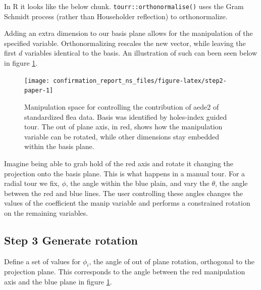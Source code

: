 \documentclass{monashthesis}
\begin{document}
In R it looks like the below chunk. \texttt{tourr::orthonormalise()}
uses the Gram Schmidt process (rather than Householder reflection) to
orthonormalize.

\begin{Shaded}
\begin{Highlighting}[]
\StringTok{ }\NormalTok{(}\NormalTok{, } 
\StringTok{ }
\StringTok{ }\OperatorTok{::}\NormalTok{(}
\end{Highlighting}
\end{Shaded}

Adding an extra dimension to our basis plane allows for the manipulation
of the specified variable. Orthonormalizing rescales the new vector,
while leaving the first \(d\) variables identical to the basis. An
illustration of such can been seen below in figure
\ref{fig:step2-paper}.

\begin{figure}

{\centering \texttt{[image: confirmation\_report\_ns\_files/figure-latex/step2-paper-1]} 

}

\caption{Manipulation space for controlling the contribution of aede2 of standardized flea data. Basis was identified by holes-index guided tour. The out of plane axis, in red, shows how the manipulation variable can be rotated, while other dimensions stay embedded within the basis plane.}\label{fig:step2-paper}
\end{figure}

Imagine being able to grab hold of the red axis and rotate it changing
the projection onto the basis plane. This is what happens in a manual
tour. For a radial tour we fix, \(\phi\), the angle within the blue
plain, and vary the \(\theta\), the angle between the red and blue
lines. The user controlling these angles changes the values of the
coefficient the manip variable and performs a constrained rotation on
the remaining variables.

\subsection{Step 3 Generate rotation}\label{step-3-generate-rotation-1}

Define a set of values for \(\phi_i\), the angle of out of plane
rotation, orthogonal to the projection plane. This corresponds to the
angle between the red manipulation axis and the blue plane in figure
\ref{fig:step2-paper}.
\end{document}
